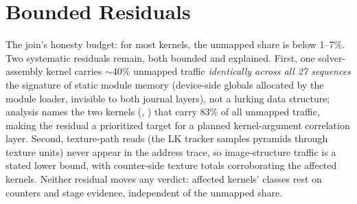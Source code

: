 \section{Bounded Residuals}
\label{sec:attr-residuals}

The join’s honesty budget: for most kernels, the unmapped share is below 1--7\%. Two systematic residuals remain, both bounded and explained. First, one solver-assembly kernel carries $\sim$40\% unmapped traffic \emph{identically across all 27 sequences} the signature of static module memory (device-side globals allocated by the module loader, invisible to both journal layers), not a lurking data structure; analysis names the two kernels (, ) that carry 83\% of all unmapped traffic, making the residual a prioritized target for a planned kernel-argument correlation layer. Second, texture-path reads (the LK tracker samples pyramids through texture units) never appear in the address trace, so image-structure traffic is a stated lower bound, with counter-side texture totals corroborating the affected kernels. Neither residual moves any verdict: affected kernels' classes rest on counters and stage evidence, independent of the unmapped share.